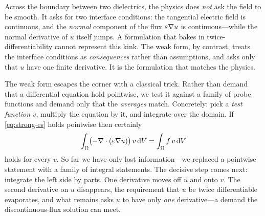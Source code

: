 \begin{physicsbox}
Across the boundary between two dielectrics, the physics does \emph{not} ask
the field to be smooth. It asks for two interface conditions: the tangential
electric field is continuous, and the \emph{normal} component of the flux
$\varepsilon\nabla u$ is continuous---while the normal derivative of $u$ itself
jumps. A formulation that bakes in twice-differentiability cannot represent this
kink. The weak form, by contrast, treats the interface conditions as
\emph{consequences} rather than assumptions, and asks only that $u$ have one
finite derivative. It is the formulation that matches the physics.
\end{physicsbox}

The weak form escapes the corner with a classical trick. Rather than demand that
a differential equation hold pointwise, we test it against a family of probe
functions and demand only that the \emph{averages} match. Concretely: pick a
\emph{test function} $v$, multiply the equation by it, and integrate over the
domain. If \cref{eq:strong-es} holds pointwise then certainly
\begin{equation}
  \int_\Omega \bigl(-\nabla\cdot(\varepsilon\nabla u)\bigr)\,v \,\mathrm{d}V
  = \int_\Omega f\,v \,\mathrm{d}V
  \label{eq:weighted-residual}
\end{equation}
holds for every $v$. So far we have only lost information---we replaced a
pointwise statement with a family of integral statements. The decisive step
comes next: integrate the left side by parts. One derivative moves off $u$ and
onto $v$. The second derivative on $u$ disappears, the requirement that $u$ be
twice differentiable evaporates, and what remains asks $u$ to have only
\emph{one} derivative---a demand the discontinuous-flux solution can meet.

